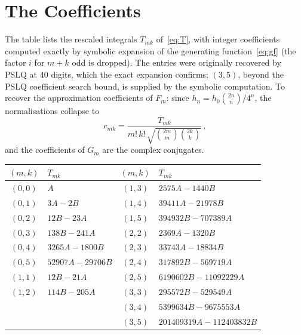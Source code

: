 \documentclass[11pt,a4paper]{article}
\begin{document}
\section{The Coefficients}

The table lists the rescaled integrals $T_{mk}$ of~\eqref{eq:T}, with
integer coefficients computed exactly by symbolic expansion of the
generating function~\eqref{eq:gf} (the factor $i$ for $m+k$ odd is
dropped). The entries were originally recovered by PSLQ at $40$
digits, which the exact expansion confirms; $(3,5)$, beyond the PSLQ
coefficient search bound, is supplied by the symbolic computation. To
recover the approximation coefficients of $F_m$: since
$h_n = h_0 \binom{2n}{n}/4^n$, the normalisations collapse to
\[
  c_{mk}
  = \frac{T_{mk}}{m!\, k!\,
    \sqrt{\binom{2m}{m}\binom{2k}{k}}}\,,
\]
and the coefficients of $G_m$ are the complex conjugates.

\begin{table}[ht]
\centering
\small
\begin{tabular}{cl@{\qquad}cl}
\toprule
$(m,k)$ & $T_{mk}$ & $(m,k)$ & $T_{mk}$ \\
\midrule
$(0,0)$ & $A$                   & $(1,3)$ & $2575A - 1440B$ \\
$(0,1)$ & $3A - 2B$             & $(1,4)$ & $39411A - 21978B$ \\
$(0,2)$ & $12B - 23A$           & $(1,5)$ & $394932B - 707389A$ \\
$(0,3)$ & $138B - 241A$         & $(2,2)$ & $2369A - 1320B$ \\
$(0,4)$ & $3265A - 1800B$       & $(2,3)$ & $33743A - 18834B$ \\
$(0,5)$ & $52907A - 29706B$     & $(2,4)$ & $317892B - 569719A$ \\
$(1,1)$ & $12B - 21A$           & $(2,5)$ & $6190602B - 11092229A$ \\
$(1,2)$ & $114B - 205A$         & $(3,3)$ & $295572B - 529549A$ \\
        &                       & $(3,4)$ & $5399634B - 9675553A$ \\
        &                       & $(3,5)$ & $201409319A - 112403832B$ \\
\bottomrule
\end{tabular}
\end{table}

\end{document}
